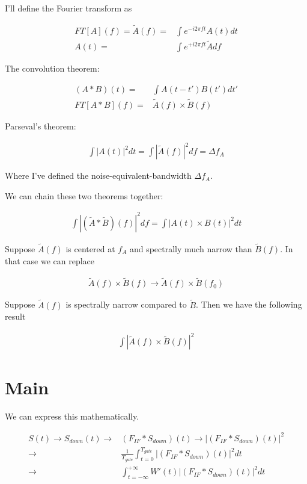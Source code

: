 \documentclass[12pt]{article}
\begin{document}
I'll define the Fourier transform as

\begin{align}
FT[A](f) = \tilde{A}(f) =& \int e^{-i2\pi ft}A(t)dt\\
A(t) =& \int e^{+i2\pi ft}\tilde{A} df
\end{align}

The convolution theorem:

\begin{align}
(A \ast B)(t)  =& \int A(t-t')B(t') dt'\\
FT\left[A \ast B\right](f) =& \tilde{A}(f)\times \tilde{B}(f)
\end{align}

Parseval's theorem:

\begin{align}
\int |A(t)|^2 dt = \int |\tilde{A}(f)|^2 df = \Delta f_A
\end{align}

Where I've defined the noise-equivalent-bandwidth $\Delta f_A$.

We can chain these two theorems together:

\begin{align}
\int |(\tilde{A} \ast \tilde{B})(f)|^2 df = \int |A(t) \times B(t)|^2 dt
\end{align}

Suppose $\tilde{A}(f)$ is centered at $f_A$ and spectrally much narrow than $\tilde{B}(f)$.
In that case we can replace

\begin{align}
\tilde{A}(f) \times \tilde{B}(f) \rightarrow \tilde{A}(f) \times \tilde{B}(f_0)
\end{align}

Suppose $\tilde{A}(f)$ is spectrally narrow compared to $\tilde{B}$.
Then we have the following result

\begin{align}
\int |\tilde{A}(f) \times \tilde{B}(f)|^2
\end{align}


\section{Main}

We can express this mathematically.

\begin{align}
S(t) \rightarrow S_{down}(t) \rightarrow& \left(F_{IF} \ast S_{down}\right)(t) \rightarrow \left|\left(F_{IF} \ast S_{down}\right)(t)\right|^2\\
\rightarrow& \frac{1}{T_{gate}} \int_{t = 0}^{T_{gate}} \left|\left(F_{IF} \ast S_{down}\right)(t)\right|^2  dt \\
\rightarrow& \int_{t=-\infty}^{+\infty} W'(t)\left|\left(F_{IF}\ast S_{down}\right)(t)\right|^2 dt
\end{align}
\end{document}
